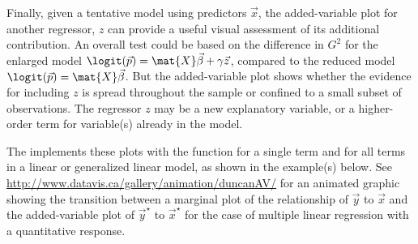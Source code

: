 \documentclass[11pt]{book}
\begin{document}
Finally, given a tentative model using predictors $\vec{x}$, the added-variable plot for
another regressor, $z$ can provide a useful visual assessment of its additional contribution.
An overall test could be based on the difference in $G^2$ for
the enlarged model $\logit(\vec{p}) = \mat{X} \vec{\beta} + \gamma \vec{z}$,
compared to the reduced model
$\logit(\vec{p}) = \mat{X} \vec{\beta}$.
But the added-variable plot shows whether the evidence for including
$z$ is spread throughout the sample or confined to a small subset
of observations.
The regressor $z$ may be a new explanatory variable, or a higher-order term for
variable(s) already in the model.

The  implements these plots with the function 
for a single term and  for all terms in a linear or generalized
linear model, as shown in the example(s) below.
See \url{http://www.datavis.ca/gallery/animation/duncanAV/} for an animated graphic
showing the transition between a marginal plot of the relationship of $\vec{y}$ to $\vec{x}$
and the added-variable plot of $\vec{y}^\star$ to $\vec{x}^\star$ for the case of 
multiple linear regression with a quantitative response.
\end{document}
